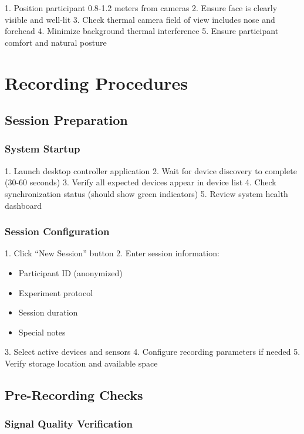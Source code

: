 1. Position participant 0.8-1.2 meters from cameras
2. Ensure face is clearly visible and well-lit
3. Check thermal camera field of view includes nose and forehead
4. Minimize background thermal interference
5. Ensure participant comfort and natural posture

\section{Recording Procedures}

\subsection{Session Preparation}

\subsubsection{System Startup}

1. Launch desktop controller application
2. Wait for device discovery to complete (30-60 seconds)
3. Verify all expected devices appear in device list
4. Check synchronization status (should show green indicators)
5. Review system health dashboard

\subsubsection{Session Configuration}

1. Click ``New Session'' button
2. Enter session information:
   \begin{itemize}
   \item Participant ID (anonymized)
   \item Experiment protocol
   \item Session duration
   \item Special notes
   \end{itemize}
3. Select active devices and sensors
4. Configure recording parameters if needed
5. Verify storage location and available space

\subsection{Pre-Recording Checks}

\subsubsection{Signal Quality Verification}

